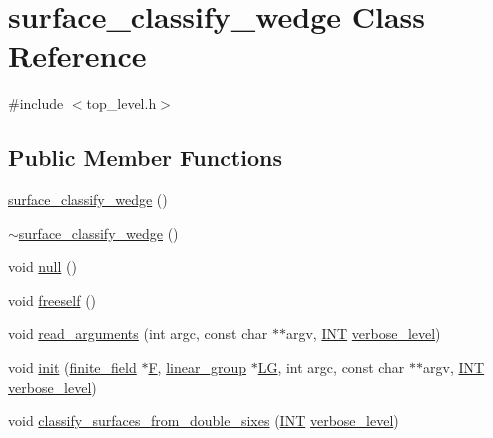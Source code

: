 \hypertarget{classsurface__classify__wedge}{}\section{surface\+\_\+classify\+\_\+wedge Class Reference}
\label{classsurface__classify__wedge}


{\ttfamily \#include $<$top\+\_\+level.\+h$>$}

\subsection*{Public Member Functions}
\begin{DoxyCompactItemize}
\item 
\mbox{\hyperlink{classsurface__classify__wedge_a0b0a36d62045d315f7f26c7396a1cea4}{surface\+\_\+classify\+\_\+wedge}} ()
\item 
\mbox{\hyperlink{classsurface__classify__wedge_a9d776a6c1f3cadb40a583b76a36f4369}{$\sim$surface\+\_\+classify\+\_\+wedge}} ()
\item 
void \mbox{\hyperlink{classsurface__classify__wedge_a0fd17ba8e9d3c3c9e72d9a934089c9c8}{null}} ()
\item 
void \mbox{\hyperlink{classsurface__classify__wedge_ad3036c5f2150519a3e575539f1e9b410}{freeself}} ()
\item 
void \mbox{\hyperlink{classsurface__classify__wedge_a9b339bce60984d007d2057f3789aefd9}{read\+\_\+arguments}} (int argc, const char $\ast$$\ast$argv, \mbox{\hyperlink{galois_8h_a09fddde158a3a20bd2dcadb609de11dc}{I\+NT}} \mbox{\hyperlink{simeon_8_c_a818073fbcc2f439e7c56952f67386122}{verbose\+\_\+level}})
\item 
void \mbox{\hyperlink{classsurface__classify__wedge_a43302106663b307aa8274a5112a7010a}{init}} (\mbox{\hyperlink{classfinite__field}{finite\+\_\+field}} $\ast$\mbox{\hyperlink{classsurface__classify__wedge_a38b41859ac3267ab89c2e277a9353c6c}{F}}, \mbox{\hyperlink{classlinear__group}{linear\+\_\+group}} $\ast$\mbox{\hyperlink{classsurface__classify__wedge_a6e2ce116a90902d7ad534c5a9b90a57a}{LG}}, int argc, const char $\ast$$\ast$argv, \mbox{\hyperlink{galois_8h_a09fddde158a3a20bd2dcadb609de11dc}{I\+NT}} \mbox{\hyperlink{simeon_8_c_a818073fbcc2f439e7c56952f67386122}{verbose\+\_\+level}})
\item 
void \mbox{\hyperlink{classsurface__classify__wedge_a6b7ca70f2edff82c197221ee978a3641}{classify\+\_\+surfaces\+\_\+from\+\_\+double\+\_\+sixes}} (\mbox{\hyperlink{galois_8h_a09fddde158a3a20bd2dcadb609de11dc}{I\+NT}} \mbox{\hyperlink{simeon_8_c_a818073fbcc2f439e7c56952f67386122}{verbose\+\_\+level}})

\end{DoxyCompactItemize}
